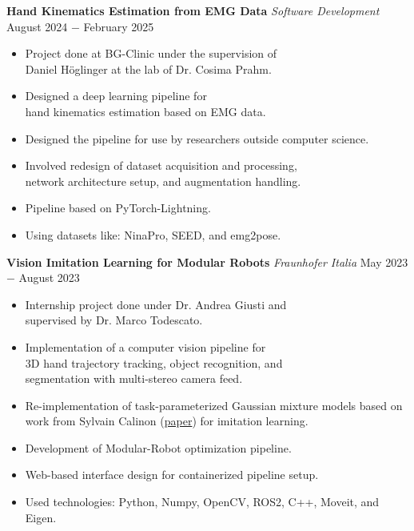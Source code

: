 \documentclass{article}
\begin{document}
\noindent \textbf{Hand Kinematics Estimation from EMG Data} \textit{Software Development} \hfill August 2024 $-$ February 2025
\begin{itemize}[noitemsep,nolistsep,leftmargin=*]
    \item Project done at BG-Clinic under the supervision of \\ 
    Daniel Höglinger at the lab of Dr. Cosima Prahm.
    \item Designed a deep learning pipeline for \\ hand kinematics estimation based on EMG data.
    \item Designed the pipeline for use by researchers outside computer science.
    \item Involved redesign of dataset acquisition and processing, \\
    network architecture setup, and augmentation handling.
    \item Pipeline based on PyTorch-Lightning.
    \item Using datasets like: NinaPro, SEED, and emg2pose.\\
\end{itemize}

\noindent \textbf{Vision Imitation Learning for Modular Robots} \textit{Fraunhofer Italia} \href{https://github.com/RobinU434/TaskParameterizedGaussianMixtureModels}{\faGithubSquare}\hfill May 2023 $-$ August 2023
\begin{itemize}[noitemsep,nolistsep,leftmargin=*]
    \item Internship project done under Dr. Andrea Giusti and \\ supervised by Dr. Marco Todescato.
    \item Implementation of a computer vision pipeline for \\ 
    3D hand trajectory tracking, object recognition, and \\
    segmentation with multi-stereo camera feed.
    \item Re-implementation of task-parameterized Gaussian mixture models based on \\ work from Sylvain Calinon (\href{https://calinon.ch/papers/Calinon-JIST2015.pdf}{paper}) for imitation learning.
    \item Development of Modular-Robot optimization pipeline.
    \item Web-based interface design for containerized pipeline setup.  
    \item Used technologies: Python, Numpy, OpenCV, ROS2, C++, Moveit, and Eigen.\\
\end{itemize}
\end{document}
